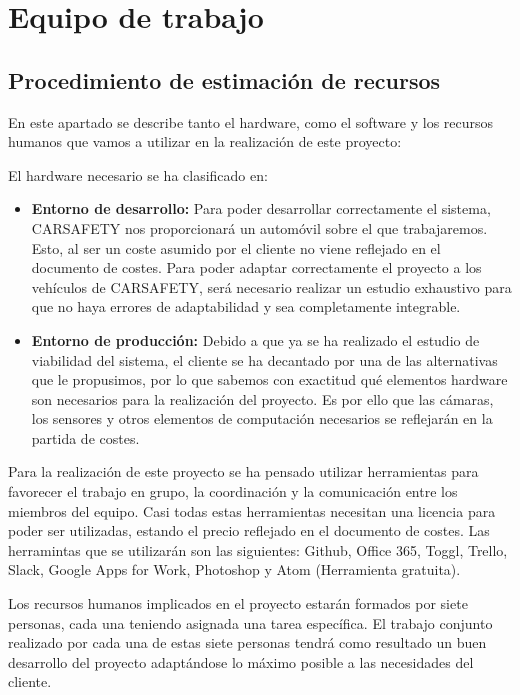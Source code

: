 
\section{Equipo de trabajo}
\subsection{Procedimiento de estimación de recursos}
\par En este apartado se describe tanto el hardware, como el software y los recursos humanos que vamos a utilizar en la realización de este proyecto:
\par El hardware necesario se ha clasificado en:
\begin{itemize}[-]
\item \textbf{Entorno de desarrollo:} Para poder desarrollar correctamente el sistema, CARSAFETY nos proporcionará un automóvil sobre el que trabajaremos. Esto, al ser un coste asumido por el cliente no viene reflejado en el documento de costes. Para poder adaptar correctamente el proyecto a los vehículos de CARSAFETY, será necesario realizar un estudio exhaustivo para que no haya errores de adaptabilidad y sea completamente integrable.
\item \textbf{Entorno de producción:} Debido a que ya se ha realizado el estudio de viabilidad del sistema, el cliente se ha decantado por una de las alternativas que le propusimos, por lo que sabemos con exactitud qué elementos hardware son necesarios para la realización del proyecto. Es por ello que las cámaras, los sensores y otros elementos de computación necesarios se reflejarán en la partida de costes.
\end{itemize}
\par Para la realización de este proyecto se ha pensado utilizar herramientas para favorecer el trabajo en grupo, la coordinación y la comunicación entre los miembros del equipo. Casi todas estas herramientas necesitan una licencia para poder ser utilizadas, estando el precio reflejado en el documento de costes. Las herramintas que se utilizarán son las siguientes: Github, Office 365, Toggl, Trello, Slack, Google Apps for Work, Photoshop y Atom (Herramienta gratuita).
\par Los recursos humanos implicados en el proyecto estarán formados por siete personas, cada una teniendo asignada una tarea específica. El trabajo conjunto realizado por cada una de estas siete personas tendrá como resultado un buen desarrollo del proyecto adaptándose lo máximo posible a las necesidades del cliente.

